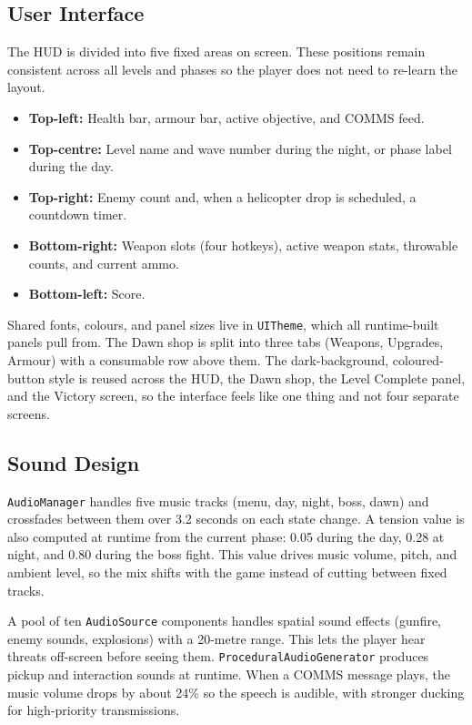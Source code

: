 \documentclass[11pt,a4paper]{article}
\begin{document}
\subsection{User Interface}

The HUD is divided into five fixed areas on screen. These positions remain consistent across all levels and phases so the player does not need to re-learn the layout.

\begin{itemize}[noitemsep]
  \item \textbf{Top-left:} Health bar, armour bar, active objective, and COMMS feed.
  \item \textbf{Top-centre:} Level name and wave number during the night, or phase label during the day.
  \item \textbf{Top-right:} Enemy count and, when a helicopter drop is scheduled, a countdown timer.
  \item \textbf{Bottom-right:} Weapon slots (four hotkeys), active weapon stats, throwable counts, and current ammo.
  \item \textbf{Bottom-left:} Score.
\end{itemize}

Shared fonts, colours, and panel sizes live in \texttt{UITheme}, which all runtime-built panels pull from. The Dawn shop is split into three tabs (Weapons, Upgrades, Armour) with a consumable row above them. The dark-background, coloured-button style is reused across the HUD, the Dawn shop, the Level Complete panel, and the Victory screen, so the interface feels like one thing and not four separate screens.

\subsection{Sound Design}

\texttt{AudioManager} handles five music tracks (menu, day, night, boss, dawn) and crossfades between them over 3.2 seconds on each state change. A tension value is also computed at runtime from the current phase: 0.05 during the day, 0.28 at night, and 0.80 during the boss fight. This value drives music volume, pitch, and ambient level, so the mix shifts with the game instead of cutting between fixed tracks.

A pool of ten \texttt{AudioSource} components handles spatial sound effects (gunfire, enemy sounds, explosions) with a 20-metre range. This lets the player hear threats off-screen before seeing them. \texttt{ProceduralAudioGenerator} produces pickup and interaction sounds at runtime. When a COMMS message plays, the music volume drops by about 24\% so the speech is audible, with stronger ducking for high-priority transmissions.
\end{document}
